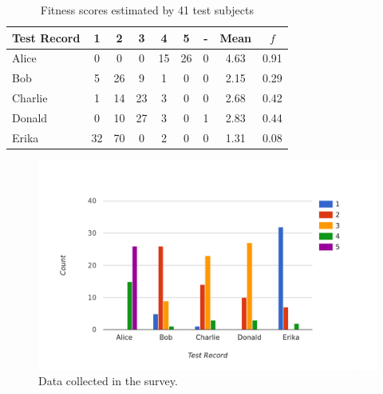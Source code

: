 \begin{table}[H]
\centering
\begin{tabular}{l||c|c|c|c|c|c||c|c}
Test Record & 1 & 2  & 3  & 4  & 5  & - & Mean & $f$ \\
\hline
Alice       & 0  & 0  & 0  & 15 & 26 & 0 & 4.63 & 0.91 \\
Bob         & 5  & 26 & 9  & 1  & 0  & 0 & 2.15 & 0.29 \\
Charlie     & 1  & 14 & 23 & 3  & 0  & 0 & 2.68 & 0.42 \\
Donald      & 0  & 10 & 27 & 3  & 0  & 1 & 2.83 & 0.44 \\
Erika       & 32 & 70 & 0  & 2  & 0  & 0 & 1.31 & 0.08 \\
\end{tabular}
\caption[Survey: Estimated Fitness Scores]{Fitness scores estimated by 41 test subjects}
\label{tab:survey_raw}
\end{table}

\begin{figure}[!t]
    \centering
    \includegraphics[width=\textwidth]{images/survey_raw.png}
    \caption[Diagram: Survey Data]{Data collected in the survey.}
    \label{survey_raw}
\end{figure}

\newpage

